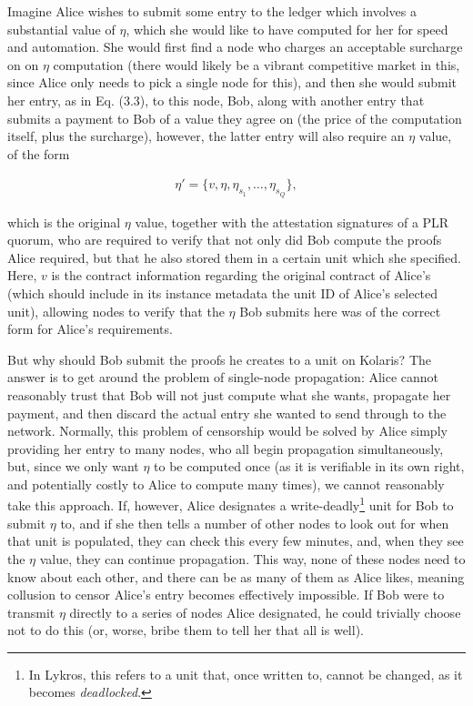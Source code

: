 \documentclass{extreport}
\begin{document}
Imagine Alice wishes to submit some entry to the ledger which involves a substantial value of \(\eta\), which she would like to have computed for her for speed and automation. She would first find a node who charges an acceptable surcharge on on \(\eta\) computation (there would likely be a vibrant competitive market in this, since Alice only needs to pick a single node for this), and then she would submit her entry, as in Eq. (3.3), to this node, Bob, along with another entry that submits a payment to Bob of a value they agree on (the price of the computation itself, plus the surcharge), however, the latter entry will also require an \(\eta\) value, of the form

\begin{align*}
\eta' = \{ v, \eta, \eta_{s_1}, \ldots, \eta_{s_Q} \}, \tag{8.1.1}
\end{align*}

which is the original \(\eta\) value, together with the attestation signatures of a PLR quorum, who are required to verify that not only did Bob compute the proofs Alice required, but that he also stored them in a certain unit which she specified. Here, \(v\) is the contract information regarding the original contract of Alice's (which should include in its instance metadata the unit ID of Alice's selected unit), allowing nodes to verify that the \(\eta\) Bob submits here was of the correct form for Alice's requirements.

But why should Bob submit the proofs he creates to a unit on Kolaris? The answer is to get around the problem of single-node propagation: Alice cannot reasonably trust that Bob will not just compute what she wants, propagate her payment, and then discard the actual entry she wanted to send through to the network. Normally, this problem of censorship would be solved by Alice simply providing her entry to many nodes, who all begin propagation simultaneously, but, since we only want \(\eta\) to be computed once (as it is verifiable in its own right, and potentially costly to Alice to compute many times), we cannot reasonably take this approach. If, however, Alice designates a write-deadly\footnote{In Lykros, this refers to a unit that, once written to, cannot be changed, as it becomes \emph{deadlocked}.} unit for Bob to submit \(\eta\) to, and if she then tells a number of other nodes to look out for when that unit is populated, they can check this every few minutes, and, when they see the \(\eta\) value, they can continue propagation. This way, none of these nodes need to know about each other, and there can be as many of them as Alice likes, meaning collusion to censor Alice's entry becomes effectively impossible. If Bob were to transmit \(\eta\) directly to a series of nodes Alice designated, he could trivially choose not to do this (or, worse, bribe them to tell her that all is well).
\end{document}
